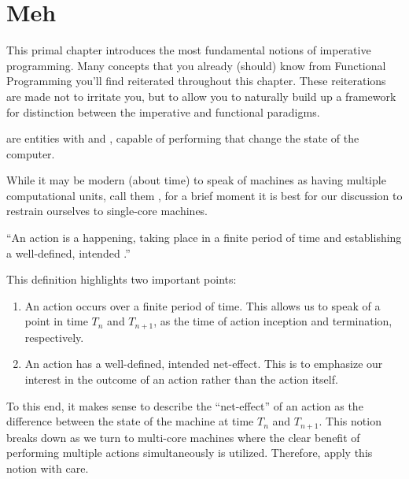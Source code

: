 \chapter{Meh}

This primal chapter introduces the most fundamental notions of imperative
programming. Many concepts that you already (should) know from Functional
Programming you'll find reiterated throughout this chapter. These reiterations
are made not to irritate you, but to allow you to naturally build up a
framework for distinction between the imperative and functional paradigms.

\begin{definition}

 are entities with  and ,
capable of performing  that change the state of the computer.

\end{definition}

While it may be modern (about time) to speak of machines as having multiple
computational units, call them , for a brief moment it is best for
our discussion to restrain ourselves to single-core machines.

\begin{definition}

``An action is a happening, taking place in a finite period of time and
establishing a well-defined, intended .''
\cite{dijkstra-introduction}

\end{definition}

This definition highlights two important points:

\begin{enumerate}

\item An action occurs over a finite period of time. This allows us to speak of
a point in time $T_n$ and $T_{n+1}$, as the time of action inception and
termination, respectively.

\item An action has a well-defined, intended net-effect. This is to emphasize
our interest in the outcome of an action rather than the action itself.

\end{enumerate}

To this end, it makes sense to describe the ``net-effect'' of an action as the
difference between the state of the machine at time $T_n$ and $T_{n+1}$. This
notion breaks down as we turn to multi-core machines where the clear benefit of
performing multiple actions simultaneously is utilized. Therefore, apply this
notion with care.

